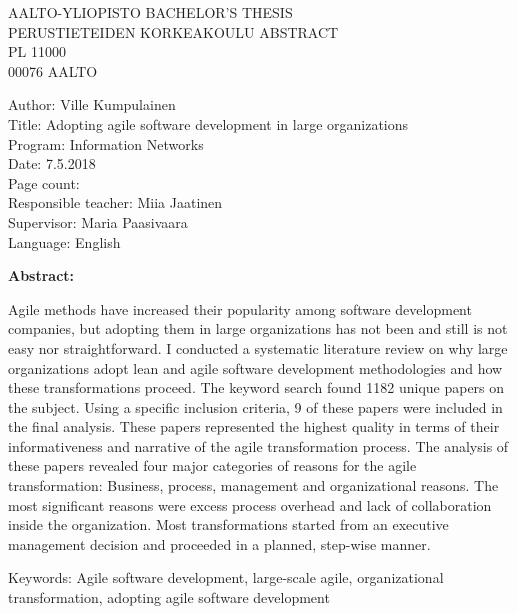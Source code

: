 
\begin{flushleft}
AALTO-YLIOPISTO \hfill BACHELOR'S THESIS \\
PERUSTIETEIDEN KORKEAKOULU \hfill ABSTRACT \\
PL 11000 \\
00076 AALTO \\
\end{flushleft}

\begin{minipage}{15cm}
\begin{framed}
    Author: Ville Kumpulainen \\
    Title: Adopting agile software development in large organizations \\
    Program: Information Networks \\
    Date: 7.5.2018 \\
        Page count:~\pageref{LastPage} \\
        Responsible teacher: Miia Jaatinen \\
        Supervisor: Maria Paasivaara \\
        Language: English
\end{framed}
\end{minipage}

\bigskip

{\large\bfseries Abstract: \par} Agile methods have increased their
popularity among software development companies, but adopting them
in large organizations has not been and still is not easy nor
straightforward. I conducted a systematic literature review on why large
organizations adopt lean and agile software development methodologies
and how these transformations proceed. The keyword search found 1182
unique papers on the subject. Using a specific inclusion criteria,
9 of these papers were included in the final analysis. These papers
represented the highest quality in terms of their informativeness
and narrative of the agile transformation process. The analysis of
these papers revealed four major categories of reasons for the agile
transformation: Business, process, management and organizational
reasons. The most significant reasons were excess process overhead and
lack of collaboration inside the organization. Most transformations
started from an executive management decision and proceeded in a
planned, step-wise manner.

\medskip

\begin{minipage}{15cm}
\begin{framed}
        Keywords: Agile software development, large-scale agile, organizational
        transformation, adopting agile software development
\end{framed}
\end{minipage}
